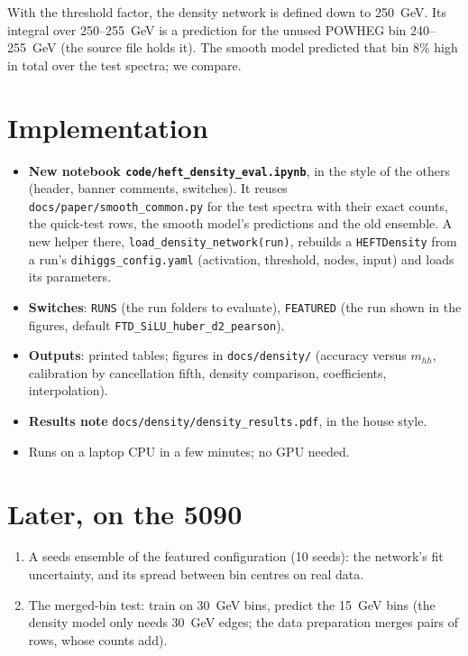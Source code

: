 \documentclass[11pt]{article}
\newcommand{\file}[1]{\nolinkurl{#1}}
\newcommand{\code}[1]{\texttt{#1}}
\newcommand{\mhh}{m_{hh}}
\begin{document}
With the threshold factor, the density network is defined down to 250~GeV. Its integral over
250--255~GeV is a prediction for the unused POWHEG bin 240--255~GeV (the source file holds it). The
smooth model predicted that bin 8\% high in total over the test spectra; we compare.

\section{Implementation}

\begin{itemize}
  \item \textbf{New notebook \file{code/heft_density_eval.ipynb}}, in the style of the others (header,
    banner comments, switches). It reuses \file{docs/paper/smooth_common.py} for the test spectra with
    their exact counts, the quick-test rows, the smooth model's predictions and the old ensemble.
    A new helper there, \code{load\_density\_network(run)}, rebuilds a \code{HEFTDensity} from a
    run's \file{dihiggs_config.yaml} (activation, threshold, nodes, input) and loads its parameters.
  \item \textbf{Switches}: \code{RUNS} (the run folders to evaluate), \code{FEATURED} (the run shown in
    the figures, default \file{FTD_SiLU_huber_d2_pearson}).
  \item \textbf{Outputs}: printed tables; figures in \file{docs/density/} (accuracy versus $\mhh$,
    calibration by cancellation fifth, density comparison, coefficients, interpolation).
  \item \textbf{Results note} \file{docs/density/density_results.pdf}, in the house style.
  \item Runs on a laptop CPU in a few minutes; no GPU needed.
\end{itemize}

\section{Later, on the 5090}
\label{sec:later}

\begin{enumerate}
  \item A seeds ensemble of the featured configuration (10 seeds): the network's fit uncertainty, and
    its spread between bin centres on real data.
  \item The merged-bin test: train on 30~GeV bins, predict the 15~GeV bins (the density model only
    needs 30~GeV edges; the data preparation merges pairs of rows, whose counts add).
\end{enumerate}
\end{document}
